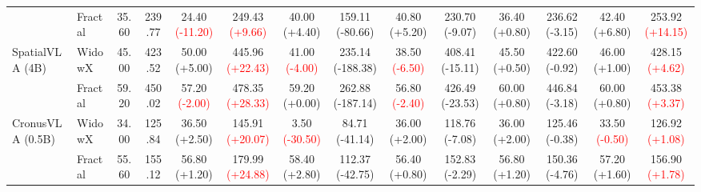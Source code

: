 \begin{table}[t]
{\begin{tabular}{llcccccccccccc}
 & Fractal & 35.60 & 239.77 & 24.40 {\scriptsize\textcolor{red}{(-11.20)}} & 249.43 {\scriptsize\textcolor{red}{(+9.66)}} & 40.00 {\scriptsize\textcolor{green!50!black}{(+4.40)}} & 159.11 {\scriptsize\textcolor{green!50!black}{(-80.66)}} & 40.80 {\scriptsize\textcolor{green!50!black}{(+5.20)}} & 230.70 {\scriptsize\textcolor{green!50!black}{(-9.07)}} & 36.40 {\scriptsize\textcolor{green!50!black}{(+0.80)}} & 236.62 {\scriptsize\textcolor{green!50!black}{(-3.15)}} & 42.40 {\scriptsize\textcolor{green!50!black}{(+6.80)}} & 253.92 {\scriptsize\textcolor{red}{(+14.15)}} \\
\cmidrule(lr){1-14}
\multirow{2}{*}{SpatialVLA (4B)} & WidowX & 45.00 & 423.52 & 50.00 {\scriptsize\textcolor{green!50!black}{(+5.00)}} & 445.96 {\scriptsize\textcolor{red}{(+22.43)}} & 41.00 {\scriptsize\textcolor{red}{(-4.00)}} & 235.14 {\scriptsize\textcolor{green!50!black}{(-188.38)}} & 38.50 {\scriptsize\textcolor{red}{(-6.50)}} & 408.41 {\scriptsize\textcolor{green!50!black}{(-15.11)}} & 45.50 {\scriptsize\textcolor{green!50!black}{(+0.50)}} & 422.60 {\scriptsize\textcolor{green!50!black}{(-0.92)}} & 46.00 {\scriptsize\textcolor{green!50!black}{(+1.00)}} & 428.15 {\scriptsize\textcolor{red}{(+4.62)}} \\
 & Fractal & 59.20 & 450.02 & 57.20 {\scriptsize\textcolor{red}{(-2.00)}} & 478.35 {\scriptsize\textcolor{red}{(+28.33)}} & 59.20 {\scriptsize\textcolor{green!50!black}{(+0.00)}} & 262.88 {\scriptsize\textcolor{green!50!black}{(-187.14)}} & 56.80 {\scriptsize\textcolor{red}{(-2.40)}} & 426.49 {\scriptsize\textcolor{green!50!black}{(-23.53)}} & 60.00 {\scriptsize\textcolor{green!50!black}{(+0.80)}} & 446.84 {\scriptsize\textcolor{green!50!black}{(-3.18)}} & 60.00 {\scriptsize\textcolor{green!50!black}{(+0.80)}} & 453.38 {\scriptsize\textcolor{red}{(+3.37)}} \\
\cmidrule(lr){1-14}
\multirow{2}{*}{CronusVLA (0.5B)} & WidowX & 34.00 & 125.84 & 36.50 {\scriptsize\textcolor{green!50!black}{(+2.50)}} & 145.91 {\scriptsize\textcolor{red}{(+20.07)}} & 3.50 {\scriptsize\textcolor{red}{(-30.50)}} & 84.71 {\scriptsize\textcolor{green!50!black}{(-41.14)}} & 36.00 {\scriptsize\textcolor{green!50!black}{(+2.00)}} & 118.76 {\scriptsize\textcolor{green!50!black}{(-7.08)}} & 36.00 {\scriptsize\textcolor{green!50!black}{(+2.00)}} & 125.46 {\scriptsize\textcolor{green!50!black}{(-0.38)}} & 33.50 {\scriptsize\textcolor{red}{(-0.50)}} & 126.92 {\scriptsize\textcolor{red}{(+1.08)}} \\
 & Fractal & 55.60 & 155.12 & 56.80 {\scriptsize\textcolor{green!50!black}{(+1.20)}} & 179.99 {\scriptsize\textcolor{red}{(+24.88)}} & 58.40 {\scriptsize\textcolor{green!50!black}{(+2.80)}} & 112.37 {\scriptsize\textcolor{green!50!black}{(-42.75)}} & 56.40 {\scriptsize\textcolor{green!50!black}{(+0.80)}} & 152.83 {\scriptsize\textcolor{green!50!black}{(-2.29)}} & 56.80 {\scriptsize\textcolor{green!50!black}{(+1.20)}} & 150.36 {\scriptsize\textcolor{green!50!black}{(-4.76)}} & 57.20 {\scriptsize\textcolor{green!50!black}{(+1.60)}} & 156.90 {\scriptsize\textcolor{red}{(+1.78)}} \\

\end{tabular}}
\end{table}
